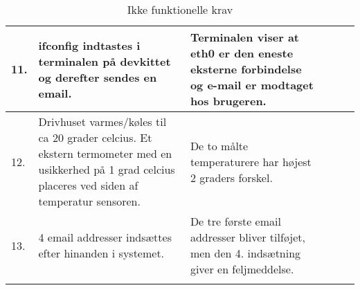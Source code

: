 \begin{longtable}{| l | X | X | p{2.5cm} | p{2 cm} |}
    11. & ifconfig indtastes i terminalen på devkittet og derefter sendes en email. & Terminalen viser at eth0 er den eneste eksterne forbindelse og e-mail er modtaget hos brugeren. & ~ & ~ \\ \hline
    12. & Drivhuset varmes/køles til ca 20 grader celcius. Et ekstern termometer med en usikkerhed på 1 grad celcius placeres ved siden af temperatur sensoren. & De to målte temperaturere har højest 2 graders forskel. & ~ & ~ \\ \hline
    13. & 4 email addresser indsættes efter hinanden i systemet. & De tre første email addresser bliver tilføjet, men den 4. indsætning giver en feljmeddelse. & ~ & ~ \\ \hline
\caption{Ikke funktionelle krav}
\label{tbl:ikkefunk}
\end{longtable}